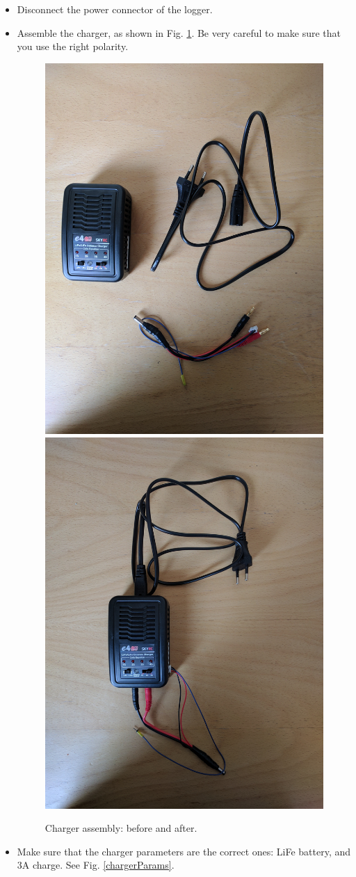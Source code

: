 \documentclass[pdftex,a4paper,12pt,twocolumn,fleqn,captions=tableheading]{scrartcl}
\begin{document}
\begin{itemize}
  \item Disconnect the power connector of the logger.

  \item Assemble the charger, as shown in Fig. \ref{chargerAssembly}. Be very careful to make sure that you use the right polarity.

  \begin{figure}
  \begin{center}
  \includegraphics[width=.45\textwidth]{Figures/IMG_20170418_100240}
  \includegraphics[width=.45\textwidth]{Figures/IMG_20170418_100245}
  \caption{\label{chargerAssembly} Charger assembly: before and after.}
  \end{center}
  \end{figure}

  \item Make sure that the charger parameters are the correct ones: LiFe battery, and 3A charge. See Fig. \ref{chargerParams}.


\end{itemize}
\end{document}
